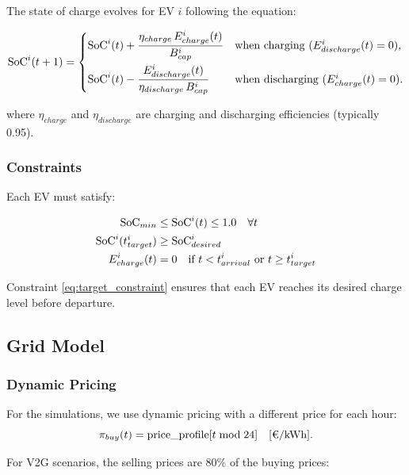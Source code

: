 The state of charge evolves for EV $i$ following the equation:

\begin{equation}
\text{SoC}^i(t+1) = \begin{cases}
\text{SoC}^i(t) + \dfrac{\eta_{charge} \, E_{charge}^i(t)}{B_{cap}^{i}} & \text{when charging ($E_{discharge}^i(t)=0$),} \\[1em]
\text{SoC}^i(t) - \dfrac{E_{discharge}^i(t)}{\eta_{discharge} \, B_{cap}^{i}} & \text{when discharging ($E_{charge}^i(t)=0$).}
\end{cases}
\end{equation}

where $\eta_{charge}$ and $\eta_{discharge}$ are charging and discharging efficiencies (typically 0.95).

\subsubsection{Constraints}

Each EV must satisfy:

\begin{align}
\text{SoC}_{min} &\leq \text{SoC}^i(t) \leq 1.0 \quad \forall t \label{eq:soc_bounds} \\
\text{SoC}^i(t_{target}^i) &\geq \text{SoC}_{desired}^i \label{eq:target_constraint} \\
E_{charge}^i(t) &= 0 \quad \text{if } t < t_{arrival}^i \text{ or } t \geq t_{target}^i \label{eq:availability}
\end{align}

Constraint \eqref{eq:target_constraint} ensures that each EV reaches its desired charge level before departure.

\subsection{Grid Model}
\label{subsec:grid_model}

\subsubsection{Dynamic Pricing}

For the simulations, we use dynamic pricing with a different price for each hour:
\begin{equation}
\pi_{buy}(t) = \text{price\_profile}[t \bmod 24] \quad [\text{€/\text{kWh}}].
\end{equation}

For V2G scenarios, the selling prices are 80\% of the buying prices:

